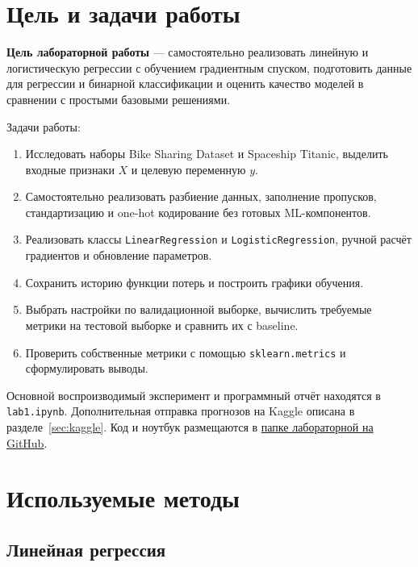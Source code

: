\documentclass[a4paper,12pt]{article}
\newcommand{\code}[1]{\texttt{#1}}
\begin{document}
\setcounter{page}{2}
\tableofcontents
\newpage

\section{Цель и задачи работы}

\textbf{Цель лабораторной работы} --- самостоятельно реализовать линейную
и логистическую регрессии с обучением градиентным спуском, подготовить
данные для регрессии и бинарной классификации и оценить качество моделей
в сравнении с простыми базовыми решениями.

Задачи работы:
\begin{enumerate}
    \item Исследовать наборы Bike Sharing Dataset и Spaceship Titanic,
    выделить входные признаки $X$ и целевую переменную $y$.
    \item Самостоятельно реализовать разбиение данных, заполнение пропусков,
    стандартизацию и one-hot кодирование без готовых ML-компонентов.
    \item Реализовать классы \code{LinearRegression} и
    \code{LogisticRegression}, ручной расчёт градиентов и обновление параметров.
    \item Сохранить историю функции потерь и построить графики обучения.
    \item Выбрать настройки по валидационной выборке, вычислить требуемые
    метрики на тестовой выборке и сравнить их с baseline.
    \item Проверить собственные метрики с помощью \code{sklearn.metrics}
    и сформулировать выводы.
\end{enumerate}

Основной воспроизводимый эксперимент и программный отчёт находятся
в \code{lab1.ipynb}. Дополнительная отправка прогнозов на Kaggle
описана в разделе~\ref{sec:kaggle}.
Код и ноутбук размещаются в \href{https://github.com/Axe-On-You/Artificial-intelligence-systems/tree/main/\%D0\%9B\%D0\%B0\%D0\%B1\%D0\%BE\%D1\%80\%D0\%B0\%D1\%82\%D0\%BE\%D1\%80\%D0\%BD\%D0\%B0\%D1\%8F\%201}{папке лабораторной на GitHub}.

\section{Используемые методы}

\subsection{Линейная регрессия}
\end{document}
